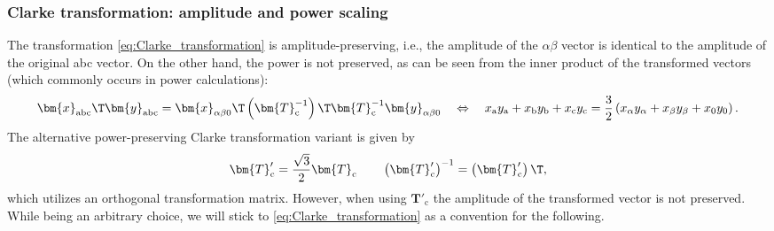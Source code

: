 \begin{frame}
	\frametitle{Clarke transformation: amplitude and power scaling}
    The transformation \eqref{eq:Clarke_transformation} is amplitude-preserving, i.e., the amplitude of the $\alpha\beta$ vector is identical to the amplitude of the original abc vector. \pause On the other hand, the power is not preserved, as can be seen from the inner product of the transformed vectors (which commonly occurs in power calculations):
    \begin{equation*}
        \bm{x}_{\mathrm{abc}}\T \bm{y}_{\mathrm{abc}} = \bm{x}_\mathrm{\alpha \beta 0}\T\left(\bm{T}_\mathrm{c}^{-1}\right)\T \bm{T}_\mathrm{c}^{-1}\bm{y}_\mathrm{\alpha \beta 0} \quad \Leftrightarrow \quad x_\mathrm{a}y_\mathrm{a} + x_\mathrm{b}y_\mathrm{b} + x_\mathrm{c}y_\mathrm{c} = \frac{3}{2}\left(x_\alpha y_\alpha + x_\beta y_\beta + x_0 y_0 \right).
    \end{equation*}
    \pause
    The alternative power-preserving Clarke transformation variant is given by
    \begin{equation}
        \renewcommand{\arraystretch}{1.2}
        \bm{T}'_\mathrm{c} = \frac{\sqrt{3}}{2} \bm{T}_\mathrm{c} \qquad \left(\bm{T}'_\mathrm{c}\right)^{-1} = \left(\bm{T}'_\mathrm{c}\right)\T,
        \label{eq:Clarke_transformation_power_preserving}
    \end{equation}
    which utilizes an orthogonal transformation matrix. \pause However, when using $\bm{T}'_\mathrm{c}$ the amplitude of the transformed vector is not preserved. While being an arbitrary choice, we will stick to \eqref{eq:Clarke_transformation} as a convention for the following. 
\end{frame}

